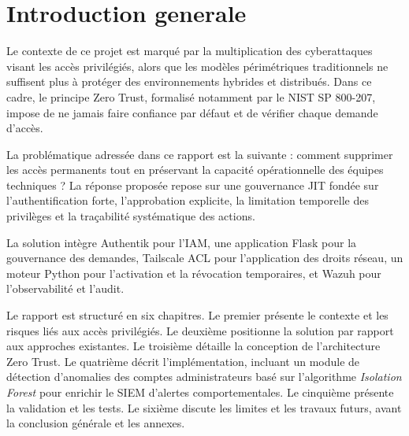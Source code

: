 \chapter*{Introduction generale}

Le contexte de ce projet est marqué par la multiplication des cyberattaques visant les accès privilégiés, alors que les modèles périmétriques traditionnels ne suffisent plus à protéger des environnements hybrides et distribués. Dans ce cadre, le principe Zero Trust, formalisé notamment par le NIST SP 800-207, impose de ne jamais faire confiance par défaut et de vérifier chaque demande d'accès.

La problématique adressée dans ce rapport est la suivante : comment supprimer les accès permanents tout en préservant la capacité opérationnelle des équipes techniques ? La réponse proposée repose sur une gouvernance JIT fondée sur l'authentification forte, l'approbation explicite, la limitation temporelle des privilèges et la traçabilité systématique des actions.

La solution intègre Authentik pour l'IAM, une application Flask pour la gouvernance des demandes, Tailscale ACL pour l'application des droits réseau, un moteur Python pour l'activation et la révocation temporaires, et Wazuh pour l'observabilité et l'audit.

Le rapport est structuré en six chapitres. Le premier présente le contexte et les risques liés aux accès privilégiés. Le deuxième positionne la solution par rapport aux approches existantes. Le troisième détaille la conception de l'architecture Zero Trust. Le quatrième décrit l'implémentation, incluant un module de détection d'anomalies des comptes administrateurs basé sur l'algorithme \textit{Isolation Forest} pour enrichir le SIEM d'alertes comportementales. Le cinquième présente la validation et les tests. Le sixième discute les limites et les travaux futurs, avant la conclusion générale et les annexes.

\clearpage